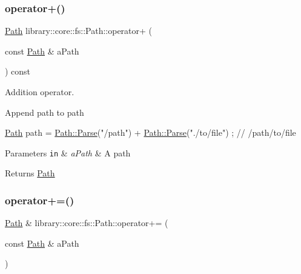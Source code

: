 \subsubsection{\texorpdfstring{operator+()}{operator+()}}
{\footnotesize\ttfamily \hyperlink{classlibrary_1_1core_1_1fs_1_1_path}{Path} library\+::core\+::fs\+::\+Path\+::operator+ (\begin{DoxyParamCaption}\item[{const \hyperlink{classlibrary_1_1core_1_1fs_1_1_path}{Path} \&}]{a\+Path }\end{DoxyParamCaption}) const}



Addition operator. 

Append path to path


\begin{DoxyCode}
\hyperlink{classlibrary_1_1core_1_1fs_1_1_path_aabc4240fc08479d1bff6b9753f2b5cc2}{Path} path = \hyperlink{classlibrary_1_1core_1_1fs_1_1_path_a6ba644b6609507e724c217bf2020f5ae}{Path::Parse}(\textcolor{stringliteral}{"/path"}) + \hyperlink{classlibrary_1_1core_1_1fs_1_1_path_a6ba644b6609507e724c217bf2020f5ae}{Path::Parse}(\textcolor{stringliteral}{"./to/file"}) ; \textcolor{comment}{// /path/to/file}
\end{DoxyCode}



\begin{DoxyParams}[1]{Parameters}
\mbox{\tt in}  & {\em a\+Path} & A path \\
\hline
\end{DoxyParams}
\begin{DoxyReturn}{Returns}
\hyperlink{classlibrary_1_1core_1_1fs_1_1_path}{Path} 
\end{DoxyReturn}
\mbox{\label{classlibrary_1_1core_1_1fs_1_1_path_a79ce7b2d9ac53e3bb22240f8cd5c883a}} 
\subsubsection{\texorpdfstring{operator+=()}{operator+=()}}
{\footnotesize\ttfamily \hyperlink{classlibrary_1_1core_1_1fs_1_1_path}{Path} \& library\+::core\+::fs\+::\+Path\+::operator+= (\begin{DoxyParamCaption}\item[{const \hyperlink{classlibrary_1_1core_1_1fs_1_1_path}{Path} \&}]{a\+Path }\end{DoxyParamCaption})}



